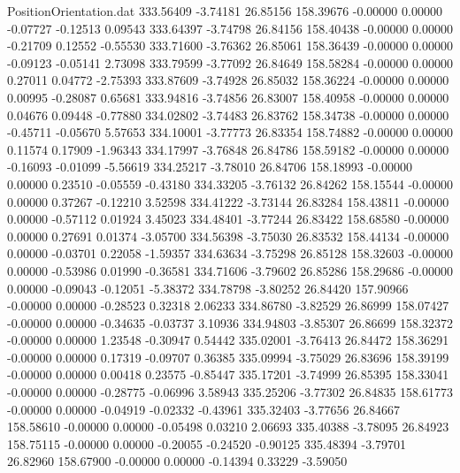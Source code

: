 \begin{filecontents}{PositionOrientation.dat}
 333.56409   -3.74181   26.85156   158.39676   -0.00000    0.00000   -0.07727   -0.12513    0.09543
 333.64397   -3.74798   26.84156   158.40438   -0.00000    0.00000   -0.21709    0.12552   -0.55530
 333.71600   -3.76362   26.85061   158.36439   -0.00000    0.00000   -0.09123   -0.05141    2.73098
 333.79599   -3.77092   26.84649   158.58284   -0.00000    0.00000    0.27011    0.04772   -2.75393
 333.87609   -3.74928   26.85032   158.36224   -0.00000    0.00000    0.00995   -0.28087    0.65681
 333.94816   -3.74856   26.83007   158.40958   -0.00000    0.00000    0.04676    0.09448   -0.77880
 334.02802   -3.74483   26.83762   158.34738   -0.00000    0.00000   -0.45711   -0.05670    5.57653
 334.10001   -3.77773   26.83354   158.74882   -0.00000    0.00000    0.11574    0.17909   -1.96343
 334.17997   -3.76848   26.84786   158.59182   -0.00000    0.00000   -0.16093   -0.01099   -5.56619
 334.25217   -3.78010   26.84706   158.18993   -0.00000    0.00000    0.23510   -0.05559   -0.43180
 334.33205   -3.76132   26.84262   158.15544   -0.00000    0.00000    0.37267   -0.12210    3.52598
 334.41222   -3.73144   26.83284   158.43811   -0.00000    0.00000   -0.57112    0.01924    3.45023
 334.48401   -3.77244   26.83422   158.68580   -0.00000    0.00000    0.27691    0.01374   -3.05700
 334.56398   -3.75030   26.83532   158.44134   -0.00000    0.00000   -0.03701    0.22058   -1.59357
 334.63634   -3.75298   26.85128   158.32603   -0.00000    0.00000   -0.53986    0.01990   -0.36581
 334.71606   -3.79602   26.85286   158.29686   -0.00000    0.00000   -0.09043   -0.12051   -5.38372
 334.78798   -3.80252   26.84420   157.90966   -0.00000    0.00000   -0.28523    0.32318    2.06233
 334.86780   -3.82529   26.86999   158.07427   -0.00000    0.00000   -0.34635   -0.03737    3.10936
 334.94803   -3.85307   26.86699   158.32372   -0.00000    0.00000    1.23548   -0.30947    0.54442
 335.02001   -3.76413   26.84472   158.36291   -0.00000    0.00000    0.17319   -0.09707    0.36385
 335.09994   -3.75029   26.83696   158.39199   -0.00000    0.00000    0.00418    0.23575   -0.85447
 335.17201   -3.74999   26.85395   158.33041   -0.00000    0.00000   -0.28775   -0.06996    3.58943
 335.25206   -3.77302   26.84835   158.61773   -0.00000    0.00000   -0.04919   -0.02332   -0.43961
 335.32403   -3.77656   26.84667   158.58610   -0.00000    0.00000   -0.05498    0.03210    2.06693
 335.40388   -3.78095   26.84923   158.75115   -0.00000    0.00000   -0.20055   -0.24520   -0.90125
 335.48394   -3.79701   26.82960   158.67900   -0.00000    0.00000   -0.14394    0.33229   -3.59050

\end{filecontents}

